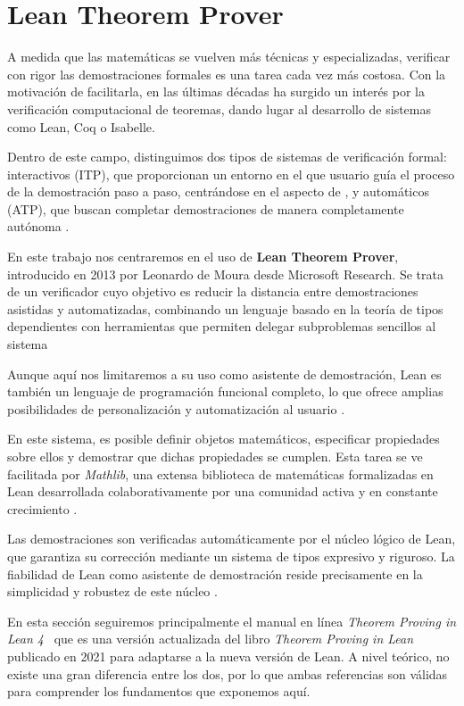 \section{Lean Theorem Prover}

A medida que las matemáticas se vuelven más técnicas y especializadas, verificar con rigor las demostraciones formales es una tarea cada vez más costosa. Con la motivación de facilitarla, en las últimas décadas ha surgido un interés por la verificación computacional de teoremas, dando lugar al desarrollo de sistemas como Lean, Coq o Isabelle.

Dentro de este campo, distinguimos dos tipos de sistemas de verificación formal: interactivos (ITP), que proporcionan un entorno en el que usuario guía el proceso de la demostración paso a paso, centrándose en el aspecto de , y automáticos (ATP), que buscan completar demostraciones de manera completamente autónoma \cite[Sección~1]{avigad2024theorem}.

En este trabajo nos centraremos en el uso de \textbf{Lean Theorem Prover}, introducido en 2013 por Leonardo de Moura desde Microsoft Research. Se trata de un verificador cuyo objetivo es reducir la distancia entre demostraciones asistidas y automatizadas, combinando un lenguaje basado en la teoría de tipos dependientes con herramientas que permiten delegar subproblemas sencillos al sistema

Aunque aquí nos limitaremos a su uso como asistente de demostración, Lean es también un lenguaje de programación funcional completo, lo que ofrece amplias posibilidades de personalización y automatización al usuario \cite[Sección~1]{avigad2024theorem}.

En este sistema, es posible definir objetos matemáticos, especificar propiedades sobre ellos y demostrar que dichas propiedades se cumplen. Esta tarea se ve facilitada por \textit{Mathlib}, una extensa biblioteca de matemáticas formalizadas en Lean desarrollada colaborativamente por una comunidad activa y en constante crecimiento \cite{mathlib}.

Las demostraciones son verificadas automáticamente por el núcleo lógico de Lean, que garantiza su corrección mediante un sistema de tipos expresivo y riguroso. La fiabilidad de Lean como asistente de demostración reside precisamente en la simplicidad y robustez de este núcleo \cite{bailey2024type}.

En esta sección seguiremos principalmente el manual en línea \textit{Theorem Proving in Lean 4}~\cite{avigad2024theorem} que es una versión actualizada del libro \textit{Theorem Proving in Lean}~\cite{avigad2021theorem} publicado en 2021 para adaptarse a la nueva versión de Lean. A nivel teórico, no existe una gran diferencia entre los dos, por lo que ambas referencias son válidas para comprender los fundamentos que exponemos aquí.


